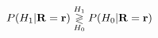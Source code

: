 \documentclass[preview]{standalone}
\begin{document}
\begin{align*}
\special{dvisvgm:raw <g id='unique000'>}P(H_1|\mathbf R=\mathbf r)\underset{H_0}{\overset{H_1}{\gtrless}}P(H_0|\mathbf R=\mathbf r)\special{dvisvgm:raw </g>}
\end{align*}
\end{document}
